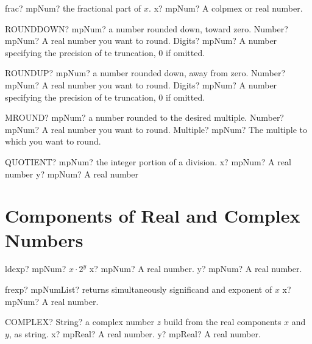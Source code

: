 \documentclass[12pt,a4paper,openany]{book}
\begin{document}
\begin{mpFunctionsExtract}
\mpFunctionOne
{frac? mpNum? the fractional part of $x$.}
{x? mpNum? A colpmex or real number.}
\end{mpFunctionsExtract}

\begin{mpFunctionsExtract}
\mpWorksheetFunctionTwoNotImplemented
{ROUNDDOWN? mpNum? a number rounded down, toward zero.}
{Number? mpNum? A real number you want to round.}
{Digits? mpNum? A number specifying the precision of te truncation, 0 if omitted.}
\end{mpFunctionsExtract}

\begin{mpFunctionsExtract}
\mpWorksheetFunctionTwoNotImplemented
{ROUNDUP? mpNum? a number rounded down, away from zero.}
{Number? mpNum? A real number you want to round.}
{Digits? mpNum? A number specifying the precision of te truncation, 0 if omitted.}
\end{mpFunctionsExtract}

\begin{mpFunctionsExtract}
\mpWorksheetFunctionTwoNotImplemented
{MROUND? mpNum? a number rounded to the desired multiple.}
{Number? mpNum? A real number you want to round.}
{Multiple? mpNum? The multiple to which you want to round.}
\end{mpFunctionsExtract}

\begin{mpFunctionsExtract}
\mpWorksheetFunctionTwoNotImplemented
{QUOTIENT? mpNum? the integer portion of a division.}
{x? mpNum? A real number}
{y? mpNum? A real number}
\end{mpFunctionsExtract}

\section{Components of Real and Complex Numbers}

\begin{mpFunctionsExtract}
\mpFunctionTwo
{ldexp? mpNum? $x \cdot 2^{y}$}
{x? mpNum? A real number.}
{y? mpNum? A real number.}
\end{mpFunctionsExtract}

\begin{mpFunctionsExtract}
\mpFunctionOne
{frexp? mpNumList? returns simultaneously significand and exponent of $x$}
{x? mpNum? A real number.}
\end{mpFunctionsExtract}

\begin{mpFunctionsExtract}
\mpWorksheetFunctionTwoNotImplemented
{COMPLEX? String? a complex number $z$ build from the real components $x$ and $y$, as string.}
{x? mpReal? A real number.}
{y? mpReal? A real number.}
\end{mpFunctionsExtract}
\end{document}
